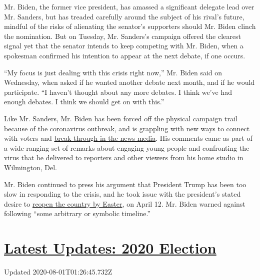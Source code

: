 Mr. Biden, the former vice president, has amassed a significant delegate
lead over Mr. Sanders, but has treaded carefully around the subject of
his rival's future, mindful of the risks of alienating the senator's
supporters should Mr. Biden clinch the nomination. But on Tuesday, Mr.
Sanders's campaign offered the clearest signal yet that the senator
intends to keep competing with Mr. Biden, when a spokesman confirmed his
intention to appear at the next debate, if one occurs.

``My focus is just dealing with this crisis right now,'' Mr. Biden said
on Wednesday, when asked if he wanted another debate next month, and if
he would participate. ``I haven't thought about any more debates. I
think we've had enough debates. I think we should get on with this.''

Like Mr. Sanders, Mr. Biden has been forced off the physical campaign
trail because of the coronavirus outbreak, and is grappling with new
ways to connect with voters and
\href{https://www.nytimes.com/2020/03/23/us/politics/joe-biden-2020-virus.html}{break
through in the news media}. His comments came as part of a wide-ranging
set of remarks about engaging young people and confronting the virus
that he delivered to reporters and other viewers from his home studio in
Wilmington, Del.

Mr. Biden continued to press his argument that President Trump has been
too slow in responding to the crisis, and he took issue with the
president's stated desire to
\href{https://www.nytimes.com/2020/03/24/us/politics/trump-coronavirus-easter.html}{reopen
the country by Easter}, on April 12. Mr. Biden warned against following
``some arbitrary or symbolic timeline.''

\hypertarget{latest-updates-2020-election}{%
\section{\texorpdfstring{\href{https://www.nytimes.com/2020/07/31/us/elections/biden-vs-trump.html?action=click\&pgtype=Article\&state=default\&region=MAIN_CONTENT_1\&context=storylines_live_updates}{Latest
Updates: 2020
Election}}{Latest Updates: 2020 Election}}\label{latest-updates-2020-election}}

Updated 2020-08-01T01:26:45.732Z

